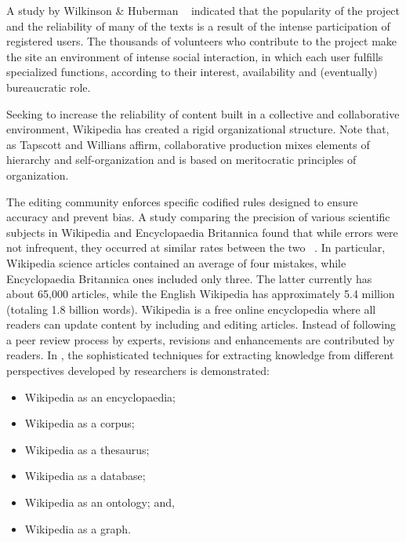 A study by Wilkinson \& Huberman ~\cite{wilkinson2007assessing} indicated that the popularity of the project and the reliability of many of the texts is a result of the intense participation of registered users.
The thousands of volunteers who contribute to the project make the site an environment of intense social interaction, in which each user fulfills specialized functions, according to their interest, availability and (eventually) bureaucratic role. 

Seeking to increase the reliability of content built in a collective and collaborative environment, Wikipedia has created a rigid organizational structure. Note that, as Tapscott and Willians \cite{tapscott2008wikinomics} affirm, collaborative production mixes elements of hierarchy and self-organization and is based on meritocratic principles of organization.

The editing community enforces specific codified rules designed to ensure accuracy and prevent bias. A study comparing the precision of various scientific subjects in Wikipedia and Encyclopaedia Britannica found that while errors were not infrequent, they occurred at similar rates between the two ~\cite{giles2005internet}. In particular, Wikipedia science articles contained an average of four mistakes, while Encyclopaedia Britannica ones included only three. The latter currently has about 65,000 articles, while the English Wikipedia has approximately 5.4 million (totaling 1.8 billion words). Wikipedia is a free online encyclopedia where all readers can update content by including and editing articles. Instead of following a peer review process by experts, revisions and enhancements are contributed by readers. %
In \cite{medelyan2009mining}, the sophisticated techniques for extracting knowledge from different perspectives developed by researchers is demonstrated:



\begin{itemize}
\item Wikipedia as an encyclopaedia; 
\item Wikipedia as a corpus; 
\item Wikipedia as a thesaurus; 
\item Wikipedia as a database; 
\item Wikipedia as an ontology; and,
\item Wikipedia as a graph.
\end{itemize}

